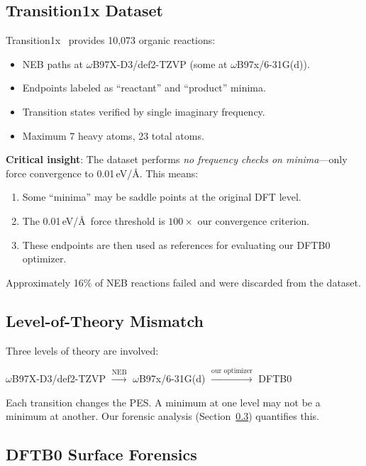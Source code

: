 \documentclass[11pt,a4paper]{article}
\theoremstyle{definition}
\begin{document}
\subsection{Transition1x Dataset}
\label{sec:transition1x}

Transition1x~\citep{transition1x} provides 10,073 organic reactions:
\begin{itemize}[nosep]
  \item NEB paths at $\omega$B97X-D3/def2-TZVP (some at $\omega$B97x/6-31G(d)).
  \item Endpoints labeled as ``reactant'' and ``product'' minima.
  \item Transition states verified by single imaginary frequency.
  \item Maximum 7 heavy atoms, 23 total atoms.
\end{itemize}

\textbf{Critical insight}: The dataset performs \emph{no frequency checks on
minima}---only force convergence to 0.01\,eV/\AA.  This means:
\begin{enumerate}[nosep]
  \item Some ``minima'' may be saddle points at the original DFT level.
  \item The 0.01\,eV/\AA\ force threshold is $100\times$ our convergence
    criterion.
  \item These endpoints are then used as references for evaluating our
    DFTB0 optimizer.
\end{enumerate}
Approximately 16\% of NEB reactions failed and were discarded from the
dataset.

\subsection{Level-of-Theory Mismatch}

Three levels of theory are involved:
\begin{center}
  $\omega$B97X-D3/def2-TZVP \quad$\xrightarrow{\text{NEB}}$\quad
  $\omega$B97x/6-31G(d) \quad$\xrightarrow{\text{our optimizer}}$\quad
  DFTB0
\end{center}
Each transition changes the PES.  A minimum at one level may not be a minimum
at another.  Our forensic analysis (Section~\ref{sec:dftb0-forensics})
quantifies this.

\subsection{DFTB0 Surface Forensics}
\label{sec:dftb0-forensics}
\end{document}
